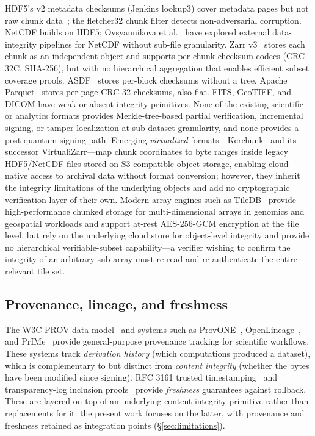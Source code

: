 \documentclass[11pt]{article}
\begin{document}
HDF5's v2 metadata checksums (Jenkins lookup3) cover metadata pages but not
raw chunk data~\cite{folk1999hdf5}; the fletcher32 chunk filter detects
non-adversarial corruption. NetCDF builds on HDF5; Ovsyannikova
et al.~\cite{ovsyannikova2023netcdf} have explored external data-integrity
pipelines for NetCDF without sub-file granularity. Zarr v3~\cite{zarr2024}
stores each chunk as an independent object and supports per-chunk checksum
codecs (CRC-32C, SHA-256), but with no hierarchical aggregation that enables
efficient subset coverage proofs. ASDF~\cite{greenfield2015asdf} stores
per-block checksums without a tree. Apache Parquet~\cite{parquet} stores
per-page CRC-32 checksums, also flat. FITS, GeoTIFF, and DICOM have weak or
absent integrity primitives. None of the existing scientific or analytics
formats provides Merkle-tree-based partial verification, incremental signing,
or tamper localization at sub-dataset granularity, and none provides a
post-quantum signing path.
Emerging \emph{virtualized} formats---Kerchunk~\cite{kerchunk} and its
successor VirtualiZarr---map chunk coordinates to byte ranges inside legacy
HDF5/NetCDF files stored on S3-compatible object storage, enabling cloud-native
access to archival data without format conversion; however, they inherit the
integrity limitations of the underlying objects and add no cryptographic
verification layer of their own. Modern array engines such as
TileDB~\cite{tiledb2020} provide high-performance chunked storage for
multi-dimensional arrays in genomics and geospatial workloads and support
at-rest AES-256-GCM encryption at the tile level, but rely on the underlying
cloud store for object-level integrity and provide no hierarchical
verifiable-subset capability---a verifier wishing to confirm the integrity of
an arbitrary sub-array must re-read and re-authenticate the entire relevant
tile set.

\subsection{Provenance, lineage, and freshness}

The W3C PROV data model~\cite{w3cprov} and systems such as
ProvONE~\cite{moreau2008provone}, OpenLineage~\cite{openlineage}, and
PrIMe~\cite{miles2007prov} provide general-purpose provenance tracking for
scientific workflows. These systems track \emph{derivation history} (which
computations produced a dataset), which is complementary to but distinct
from \emph{content integrity} (whether the bytes have been modified since
signing). RFC 3161 trusted timestamping~\cite{rfc3161} and transparency-log
inclusion proofs~\cite{trillian,laurie2014certificate} provide \emph{freshness}
guarantees against rollback. These are layered on top of an underlying
content-integrity primitive rather than replacements for it: the present work
focuses on the latter, with provenance and freshness retained as integration
points (\S\ref{sec:limitations}).
\end{document}
